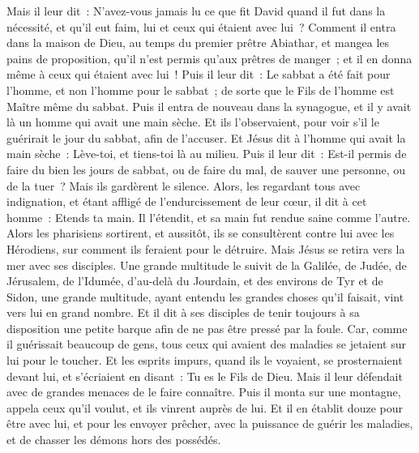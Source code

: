 \begin{multicols}{2}
Mais il leur dit~: N'avez-vous jamais lu ce que fit David quand il fut dans la nécessité, et qu'il eut faim, lui et ceux qui étaient avec lui~?
Comment il entra dans la maison de Dieu, au temps du premier prêtre Abiathar, et mangea les pains de proposition, qu'il n'est permis qu'aux prêtres de manger~; et il en donna même à ceux qui étaient avec lui~!
Puis il leur dit~: Le sabbat a été fait pour l'homme, et non l'homme pour le sabbat~;
de sorte que le Fils de l'homme est Maître même du sabbat.
\VerseOne{}Puis il entra de nouveau dans la synagogue, et il y avait là un homme qui avait une main sèche.
Et ils l'observaient, pour voir s'il le guérirait le jour du sabbat, afin de l'accuser.
Et Jésus dit à l'homme qui avait la main sèche~: Lève-toi, et tiens-toi là au milieu.
Puis il leur dit~: Est-il permis de faire du bien les jours de sabbat, ou de faire du mal, de sauver une personne, ou de la tuer~? Mais ils gardèrent le silence.
Alors, les regardant tous avec indignation, et étant affligé de l'endurcissement de leur cœur, il dit à cet homme~: Etends ta main. Il l'étendit, et sa main fut rendue saine comme l'autre.
Alors les pharisiens sortirent, et aussitôt, ils se consultèrent contre lui avec les Hérodiens, sur comment ils feraient pour le détruire.
Mais Jésus se retira vers la mer avec ses disciples. Une grande multitude le suivit de la Galilée,
de Judée, de Jérusalem, de l'Idumée, d'au-delà du Jourdain, et des environs de Tyr et de Sidon, une grande multitude, ayant entendu les grandes choses qu'il faisait, vint vers lui en grand nombre.
Et il dit à ses disciples de tenir toujours à sa disposition une petite barque afin de ne pas être pressé par la foule.
Car, comme il guérissait beaucoup de gens, tous ceux qui avaient des maladies se jetaient sur lui pour le toucher.
Et les esprits impurs, quand ils le voyaient, se prosternaient devant lui, et s'écriaient en disant~: Tu es le Fils de Dieu.
Mais il leur défendait avec de grandes menaces de le faire connaître.
Puis il monta sur une montagne, appela ceux qu'il voulut, et ils vinrent auprès de lui.
Et il en établit douze pour être avec lui,
et pour les envoyer prêcher, avec la puissance de guérir les maladies, et de chasser les démons hors des possédés.

\end{multicols}
